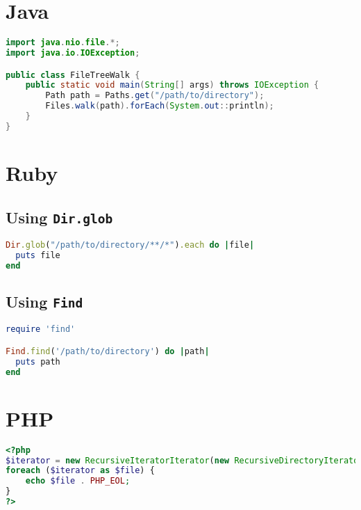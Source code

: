 \documentclass{article}
\begin{document}
\section{Java}
\begin{lstlisting}[language=Java]
import java.nio.file.*;
import java.io.IOException;

public class FileTreeWalk {
    public static void main(String[] args) throws IOException {
        Path path = Paths.get("/path/to/directory");
        Files.walk(path).forEach(System.out::println);
    }
}
\end{lstlisting}

\section{Ruby}
\subsection{Using \texttt{Dir.glob}}
\begin{lstlisting}[language=Ruby]
Dir.glob("/path/to/directory/**/*").each do |file|
  puts file
end
\end{lstlisting}

\subsection{Using \texttt{Find}}
\begin{lstlisting}[language=Ruby]
require 'find'

Find.find('/path/to/directory') do |path|
  puts path
end
\end{lstlisting}

\section{PHP}
\begin{lstlisting}[language=PHP]
<?php
$iterator = new RecursiveIteratorIterator(new RecursiveDirectoryIterator('/path/to/directory'));
foreach ($iterator as $file) {
    echo $file . PHP_EOL;
}
?>
\end{lstlisting}
\end{document}
